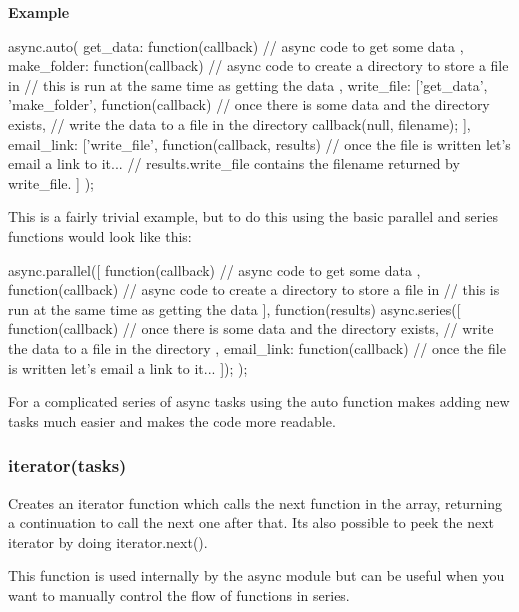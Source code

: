 {\bfseries Example} \begin{DoxyVerb}async.auto({
    get_data: function(callback){
        // async code to get some data
    },
    make_folder: function(callback){
        // async code to create a directory to store a file in
        // this is run at the same time as getting the data
    },
    write_file: ['get_data', 'make_folder', function(callback){
        // once there is some data and the directory exists,
        // write the data to a file in the directory
        callback(null, filename);
    }],
    email_link: ['write_file', function(callback, results){
        // once the file is written let's email a link to it...
        // results.write_file contains the filename returned by write_file.
    }]
});
\end{DoxyVerb}


This is a fairly trivial example, but to do this using the basic parallel and series functions would look like this\+: \begin{DoxyVerb}async.parallel([
    function(callback){
        // async code to get some data
    },
    function(callback){
        // async code to create a directory to store a file in
        // this is run at the same time as getting the data
    }
],
function(results){
    async.series([
        function(callback){
            // once there is some data and the directory exists,
            // write the data to a file in the directory
        },
        email_link: function(callback){
            // once the file is written let's email a link to it...
        }
    ]);
});
\end{DoxyVerb}


For a complicated series of async tasks using the auto function makes adding new tasks much easier and makes the code more readable.





\label{_iterator}%
 \subsubsection*{iterator(tasks)}

Creates an iterator function which calls the next function in the array, returning a continuation to call the next one after that. Its also possible to \textquotesingle{}peek\textquotesingle{} the next iterator by doing iterator.\+next().

This function is used internally by the async module but can be useful when you want to manually control the flow of functions in series.

